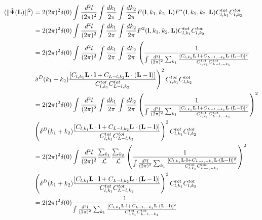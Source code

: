 \documentclass[12pt]{article}
\newcommand{\beq}{\begin{equation}}
\newcommand{\eeq}{\end{equation}}
\newcommand{\beqal}{\begin{aligned}}
\newcommand{\eeqal}{\end{aligned}}
\def\l{{\bf l}}
\def\L{{\bf L}}
\def\d2l{\frac{d^2l}{(2\pi)^2}}
\def\dko{\frac{dk_1}{2\pi}}
\def\dkt{\frac{dk_2}{2\pi}}
\numberwithin{equation}{section}
\begin{document}
\beq
\beqal
\langle ||\hat{\Psi}(\L)||^2\rangle &= 2 (2\pi)^2 \delta(0) \int \d2l \int \dko \int
\dkt F(\l,k_1,k_2,\L) F^*(\l,k_1,k_2,\L) C^{tot}_{l,k_1}C^{tot}_{l,k_2} 
\\
&= 2 (2\pi)^2 \delta(0) \int \d2l \int \dko \int
\dkt F^2(\l,k_1,k_2,\L)C^{tot}_{l,k_1}C^{tot}_{l,k_2} 
\\
&= 2 (2\pi)^2 \delta(0)  \int \d2l \int \dko \int \dkt \left( \frac{1}{\int \frac{d^2 l}{(2\pi)^2} \sum_{k_1} \frac{[C_{l,k_1} \L\cdot \l +
		C_{L-l,-k_1} \L\cdot (\L-\l)]^2}{C^{tot}_{l,k_1}C^{tot}_{L-l,-k_1}} }   \right.
\\
& \left.	\delta^D(k_1+k_2) \frac{[C_{l,k_1} \L\cdot \l +
	C_{L-l,k_2} \L\cdot (\L-\l)]}{C^{tot}_{l,k_1}C^{tot}_{L-l,k_2}} \right)^2 C^{tot}_{l,k_1}C^{tot}_{l,k_2} 
\\
&=  2 (2\pi)^2\delta(0) \int \d2l \int \dko \int \dkt \left( \frac{1}{\int \frac{d^2 l}{(2\pi)^2} \sum_{k_1} \frac{[C_{l,k_1} \L\cdot \l +
		C_{L-l,-k_1} \L\cdot (\L-\l)]^2}{C^{tot}_{l,k_1}C^{tot}_{L-l,-k_1}} } \right)^2
\\
& \left(	\delta^D(k_1+k_2) \frac{[C_{l,k_1} \L\cdot \l +
	C_{L-l,k_2} \L\cdot (\L-\l)]}{C^{tot}_{l,k_1}C^{tot}_{L-l,k_2}} \right)^2 C^{tot}_{l,k_1}C^{tot}_{l,k_2} 
\\
&=  2 (2\pi)^2\delta(0) \int \d2l \frac{\sum_{k_1}}{\mathcal{L}} \frac{\sum_{k_2}}{\mathcal{L}} \left( \frac{1}{\int \frac{d^2 l}{(2\pi)^2} \sum_{k_1} \frac{[C_{l,k_1} \L\cdot \l +
		C_{L-l,-k_1} \L\cdot (\L-\l)]^2}{C^{tot}_{l,k_1}C^{tot}_{L-l,-k_1}} } \right)^2
\\
& \left(	\delta^D(k_1+k_2) \frac{[C_{l,k_1} \L\cdot \l +
	C_{L-l,k_2} \L\cdot (\L-\l)]}{C^{tot}_{l,k_1}C^{tot}_{L-l,k_2}} \right)^2 C^{tot}_{l,k_1}C^{tot}_{l,k_2} 
\\
	&=  2 (2\pi)^2\delta(0) \frac{1}{\int \frac{d^2 l}{(2\pi)^2} \sum_{k_1} \frac{[C_{l,k_1} \L\cdot \l +
		C_{L-l,-k_1} \L\cdot (\L-\l)]^2}{C^{tot}_{l,k_1}C^{tot}_{L-l,-k_1}} } 
\eeqal
\eeq
%
%
%
\end{document}
